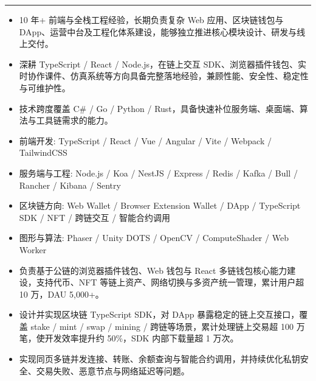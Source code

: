 \noindent\textcolor{ICBlue}{\rule{\linewidth}{0.5pt}}
\begin{itemize}
  \item 10 年+ 前端与全栈工程经验，长期负责复杂 Web 应用、区块链钱包与 DApp、运营中台及工程化体系建设，能够独立推进核心模块设计、研发与线上交付。
  \item 深耕 TypeScript / React / Node.js，在链上交互 SDK、浏览器插件钱包、实时协作课件、仿真系统等方向具备完整落地经验，兼顾性能、安全性、稳定性与可维护性。
  \item 技术跨度覆盖 C\# / Go / Python / Rust，具备快速补位服务端、桌面端、算法与工具链需求的能力。
\end{itemize}


\begin{itemize}
  \item 前端开发: TypeScript / React / Vue / Angular / Vite / Webpack / TailwindCSS
  \item 服务端与工程: Node.js / Koa / NestJS / Express / Redis / Kafka / Bull / Rancher / Kibana / Sentry
  \item 区块链方向: Web Wallet / Browser Extension Wallet / DApp / TypeScript SDK / NFT / 跨链交互 / 智能合约调用
  \item 图形与算法: Phaser / Unity DOTS / OpenCV / ComputeShader / Web Worker
\end{itemize}


\begin{itemize}
  \item 负责基于公链的浏览器插件钱包、Web 钱包与 React 多链钱包核心能力建设，支持代币、NFT 等链上资产、网络切换与多资产统一管理，累计用户超 10 万，DAU 5,000+。
  \item 设计并实现区块链 TypeScript SDK，对 DApp 暴露稳定的链上交互接口，覆盖 stake / mint / swap / mining / 跨链等场景，累计处理链上交易超 100 万笔，使开发效率提升约 50\%，SDK 内部下载量超 1 万次。
  \item 实现同页多链并发连接、转账、余额查询与智能合约调用，并持续优化私钥安全、交易失败、恶意节点与网络延迟等问题。
\end{itemize}

